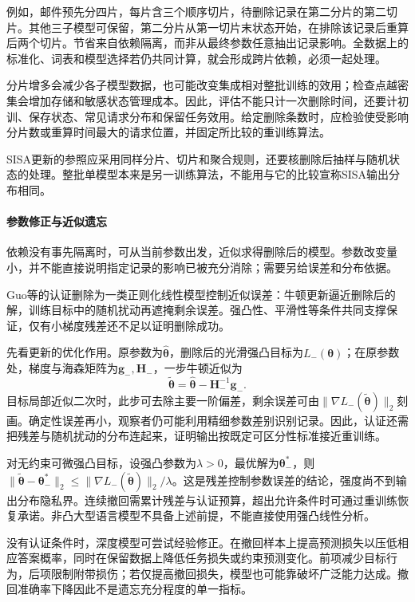 例如，邮件预先分四片，每片含三个顺序切片，待删除记录在第二分片的第二切片。其他三子模型可保留，第二分片从第一切片末状态开始，在排除该记录后重算后两个切片。节省来自依赖隔离，而非从最终参数任意抽出记录影响。全数据上的标准化、词表和模型选择若仍共同计算，就会形成跨片依赖，必须一起处理。

分片增多会减少各子模型数据，也可能改变集成相对整批训练的效用；检查点越密集会增加存储和敏感状态管理成本。因此，评估不能只计一次删除时间，还要计初训、保存状态、常见请求分布和保留任务效用。给定删除条数时，应检验使受影响分片数或重算时间最大的请求位置，并固定所比较的重训练算法。

SISA更新的参照应采用同样分片、切片和聚合规则，还要核删除后抽样与随机状态的处理。整批单模型本来是另一训练算法，不能用与它的比较宣称SISA输出分布相同。

\paragraph{参数修正与近似遗忘}

依赖没有事先隔离时，可从当前参数出发，近似求得删除后的模型。参数改变量小，并不能直接说明指定记录的影响已被充分消除；需要另给误差和分布依据。

Guo等的认证删除为一类正则化线性模型控制近似误差：牛顿更新逼近删除后的解，训练目标中的随机扰动再遮掩剩余误差。强凸性、平滑性等条件共同支撑保证，仅有小梯度残差还不足以证明删除成功。

先看更新的优化作用。原参数为$\hat{\bm\theta}$，删除后的光滑强凸目标为$L_-(\bm\theta)$；在原参数处，梯度与海森矩阵为$\bm g_-,\bm H_-$，一步牛顿近似为
\begin{equation}
 \tilde{\bm\theta}
 =\hat{\bm\theta}-\bm H_-^{-1}\bm g_-.
 \label{eq:privacy-newton-removal}
\end{equation}
目标局部近似二次时，此步可去除主要一阶偏差，剩余误差可由$\lVert\nabla L_-(\tilde{\bm\theta})\rVert_2$刻画。确定性误差再小，观察者仍可能利用精细参数差别识别记录。因此，认证还需把残差与随机扰动的分布连起来，证明输出按既定可区分性标准接近重训练。

对无约束可微强凸目标，设强凸参数为$\lambda>0$，最优解为$\bm\theta_-^*$，则$\lVert\tilde{\bm\theta}-\bm\theta_-^*\rVert_2\leq\lVert\nabla L_-(\tilde{\bm\theta})\rVert_2/\lambda$。这是残差控制参数误差的结论，强度尚不到输出分布隐私界。连续撤回需累计残差与认证预算，超出允许条件时可通过重训练恢复承诺。非凸大型语言模型不具备上述前提，不能直接使用强凸线性分析。

没有认证条件时，深度模型可尝试经验修正。在撤回样本上提高预测损失以压低相应答案概率，同时在保留数据上降低任务损失或约束预测变化。前项减少目标行为，后项限制附带损伤；若仅提高撤回损失，模型也可能靠破坏广泛能力达成。撤回准确率下降因此不是遗忘充分程度的单一指标。

